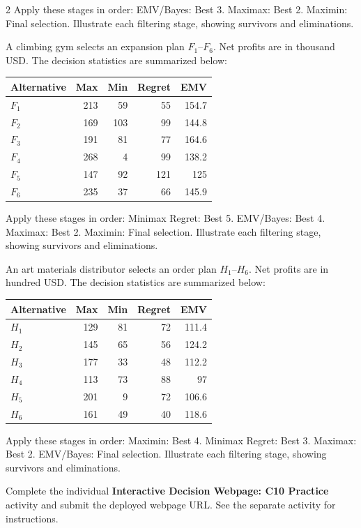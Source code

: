 \begin{multicols}{2}
\noindent Apply these stages in order: EMV/Bayes: Best 3. Maximax: Best 2. Maximin: Final selection.
Illustrate each filtering stage, showing survivors and eliminations.

A climbing gym selects an expansion plan $F_1$--$F_6$. Net profits are in thousand USD. The decision statistics are summarized below:
\vspace{-4mm}
\begin{center}\small\setlength{\tabcolsep}{4pt}
	\begin{tabular}{lrrrr}\toprule
		Alternative & Max & Min & Regret & EMV\\ \midrule
		$F_1$ & 213 & 59 & 55 & 154.7\\
		$F_2$ & 169 & 103 & 99 & 144.8\\
		$F_3$ & 191 & 81 & 77 & 164.6\\
		$F_4$ & 268 & 4 & 99 & 138.2\\
		$F_5$ & 147 & 92 & 121 & 125\\
		$F_6$ & 235 & 37 & 66 & 145.9\\
		\bottomrule
	\end{tabular}
\end{center}
\vspace{-3mm}
\noindent Apply these stages in order: Minimax Regret: Best 5. EMV/Bayes: Best 4. Maximax: Best 2. Maximin: Final selection.
Illustrate each filtering stage, showing survivors and eliminations.

An art materials distributor selects an order plan $H_1$--$H_6$. Net profits are in hundred USD. The decision statistics are summarized below:
\vspace{-3mm}
\begin{center}\small\setlength{\tabcolsep}{4pt}
	\begin{tabular}{lrrrr}\toprule
		Alternative & Max & Min & Regret & EMV\\ \midrule
		$H_1$ & 129 & 81 & 72 & 111.4\\
		$H_2$ & 145 & 65 & 56 & 124.2\\
		$H_3$ & 177 & 33 & 48 & 112.2\\
		$H_4$ & 113 & 73 & 88 & 97\\
		$H_5$ & 201 & 9 & 72 & 106.6\\
		$H_6$ & 161 & 49 & 40 & 118.6\\
		\bottomrule
	\end{tabular}
\end{center}
\vspace{-3mm}
\noindent Apply these stages in order: Maximin: Best 4. Minimax Regret: Best 3. Maximax: Best 2. EMV/Bayes: Final selection.
Illustrate each filtering stage, showing survivors and eliminations.

\par
{}
		Complete the individual \textbf{Interactive Decision Webpage: C10 Practice} activity and submit the deployed webpage URL. See the separate activity for instructions.
		
	\end{multicols}


